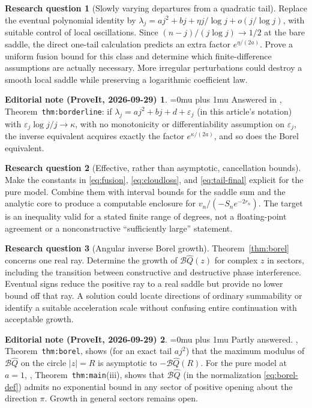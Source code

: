 \documentclass[11pt,a4paper]{article}
\numberwithin{equation}{section}
\theoremstyle{definition}\newtheorem{definition}[theorem]{Definition}
\newtheorem{question}{Research question}
\theoremstyle{remark}\newtheorem{remark}[theorem]{Remark}
\theoremstyle{definition}
\newtheorem*{ednoteinner}{Editorial note (ProveIt, 2026-09-29)}
\newenvironment{ednote}{\begin{ednoteinner}\sloppy\Urlmuskip=0mu plus 1mu\relax}{\end{ednoteinner}}
\newcommand{\Q}{\widehat Q}
\newcommand{\Bcal}{\mathcal B}
\begin{document}
\begin{question}[Slowly varying departures from a quadratic tail]
Replace the eventual polynomial identity by
\(\lambda_j=aj^2+bj+\eta j/\log j+o(j/\log j)\), with suitable control
of local oscillations. Since \((n-j)/(j\log j)\to1/2\) at the bare
saddle, the direct one-tail calculation predicts an extra factor
\(e^{\eta/(2a)}\). Prove a uniform fusion bound for this class and determine
which finite-difference assumptions are actually necessary. More irregular
perturbations could destroy a smooth local saddle while preserving a
logarithmic coefficient law.
\end{question}
\begin{ednote}
Answered in \cite{ed:qfr}, Theorem~\texttt{thm:borderline}: if
\(\lambda_j=aj^2+bj+d+\varepsilon_j\) (in this article's notation) with
\(\varepsilon_j\log j/j\to\kappa\), with no monotonicity or
differentiability assumption on \(\varepsilon_j\), the inverse equivalent
acquires exactly the factor \(e^{\kappa/(2a)}\), and so does the Borel
equivalent.
\end{ednote}

\begin{question}[Effective, rather than asymptotic, cancellation bounds]
Make the constants in \eqref{eq:fusion}, \eqref{eq:cloudloss}, and
\eqref{eq:tail-final} explicit for the pure model. Combine them with
interval bounds for the saddle sum and the analytic core to produce a
computable enclosure for \(v_n/(-S_ne^{-2r_n})\). The target is an
inequality valid for a stated finite range of degrees, not a floating-point
agreement or a nonconstructive ``sufficiently large'' statement.
\end{question}

\begin{question}[Angular inverse Borel growth]
Theorem~\ref{thm:borel} concerns one real ray. Determine the growth of
\(\Bcal\Q(z)\) for complex \(z\) in sectors, including the transition
between constructive and destructive phase interference. Eventual signs
reduce the positive ray to a real saddle but provide no lower bound off
that ray. A solution could locate directions of ordinary summability or
identify a suitable acceleration scale without confusing entire
continuation with acceptable growth.
\end{question}
\begin{ednote}
Partly answered. \cite{ed:sqi}, Theorem~\texttt{thm:borel}, shows (for an
exact tail \(aj^2\)) that the maximum modulus of \(\Bcal\Q\) on the circle
\(|z|=R\) is asymptotic to \(-\Bcal\Q(R)\). For the pure model at \(a=1\),
\cite{ed:nbq}, Theorem~\texttt{thm:main}(iii), shows that \(\Bcal\Q\) (in
the normalization \eqref{eq:borel-def}) admits no exponential bound in any
sector of positive opening about the direction \(\pi\). Growth in general
sectors remains open.
\end{ednote}
\end{document}
